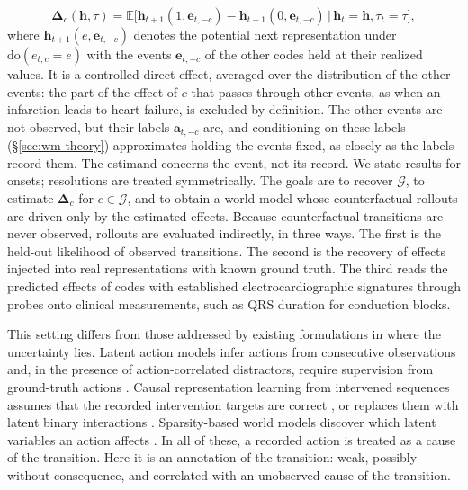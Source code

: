 \begin{equation}
\label{eq:wm-estimand}
\boldsymbol{\Delta}_c(\mathbf{h},\tau)=\mathbb{E}\big[\mathbf{h}_{t+1}(1,\mathbf{e}_{t,-c})-\mathbf{h}_{t+1}(0,\mathbf{e}_{t,-c})\,\big|\,\mathbf{h}_t=\mathbf{h},\tau_t=\tau\big],
\end{equation}
where $\mathbf{h}_{t+1}(e,\mathbf{e}_{t,-c})$ denotes the potential next representation under $\mathrm{do}(e_{t,c}=e)$ with the events $\mathbf{e}_{t,-c}$ of the other codes held at their realized values. It is a controlled direct effect, averaged over the distribution of the other events: the part of the effect of $c$ that passes through other events, as when an infarction leads to heart failure, is excluded by definition. The other events are not observed, but their labels $\mathbf{a}_{t,-c}$ are, and conditioning on these labels (\S\ref{sec:wm-theory}) approximates holding the events fixed, as closely as the labels record them. The estimand concerns the event, not its record. We state results for onsets; resolutions are treated symmetrically. The goals are to recover $\mathcal{G}$, to estimate $\boldsymbol{\Delta}_c$ for $c\in\mathcal{G}$, and to obtain a world model whose counterfactual rollouts are driven only by the estimated effects. Because counterfactual transitions are never observed, rollouts are evaluated indirectly, in three ways. The first is the held-out likelihood of observed transitions. The second is the recovery of effects injected into real representations with known ground truth. The third reads the predicted effects of codes with established electrocardiographic signatures through probes onto clinical measurements, such as QRS duration for conduction blocks.

This setting differs from those addressed by existing formulations in where the uncertainty lies. Latent action models infer actions from consecutive observations and, in the presence of action-correlated distractors, require supervision from ground-truth actions \citep{nikulin2025laom}. Causal representation learning from intervened sequences assumes that the recorded intervention targets are correct \citep{lippe2022citris}, or replaces them with latent binary interactions \citep{lippe2023biscuit}. Sparsity-based world models discover which latent variables an action affects \citep{lei2025spartan,lachapelle2026sparsity}. In all of these, a recorded action is treated as a cause of the transition. Here it is an annotation of the transition: weak, possibly without consequence, and correlated with an unobserved cause of the transition.

